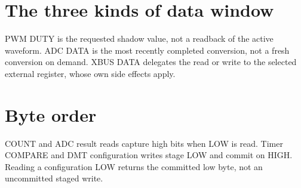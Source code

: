 \documentclass[10pt]{article}
\begin{document}
\section*{The three kinds of data window}
PWM DUTY is the requested shadow value, not a readback of the active waveform. ADC DATA is the most recently completed conversion, not a fresh conversion on demand. XBUS DATA delegates the read or write to the selected external register, whose own side effects apply.
\section*{Byte order}
COUNT and ADC result reads capture high bits when LOW is read. Timer COMPARE and DMT configuration writes stage LOW and commit on HIGH. Reading a configuration LOW returns the committed low byte, not an uncommitted staged write.
\end{document}
